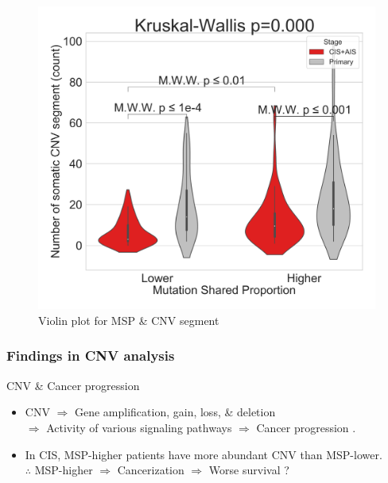 \documentclass{beamer}
\begin{document}
\begin{frame}[allowframebreaks]
                    \begin{figure}
                        \includegraphics[width=0.4 \linewidth]{figures/MutationSharedProportion_CNV/Segment/Segment.BWA.Sequenza.SQC.median/Violin_Mutation Shared Proportion.pdf}
                        \caption{Violin plot for MSP \& CNV segment}
                    \end{figure}
                \end{frame}

            \begin{frame}
                \frametitle{Findings in CNV analysis}

                \begin{block}{CNV \& Cancer progression}
                    \begin{itemize}
                        \item CNV $\Rightarrow$ Gene amplification, gain, loss, \& deletion \\
                            $\Rightarrow$ Activity of various signaling pathways $\Rightarrow$ Cancer progression \cite{copynumber-01, copynumber-02}.
                        \item In CIS, MSP-higher patients have more abundant CNV than MSP-lower. \\
                            $\therefore$ MSP-higher $\Rightarrow$ Cancerization $\Rightarrow$ Worse survival ?
                    \end{itemize}
                \end{block}
            \end{frame}
\end{document}
